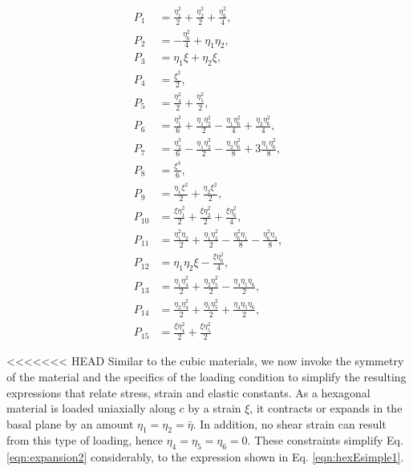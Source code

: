 \documentclass[showpacs,aps,floatfix,prb,reprint,superscriptaddress,onecolumn]{revtex4-1}
\begin{document}
\begin{enumerate}
\begin{subequations}
\label{eqn:expansion2detailed} 
\begin{align}
        P_{1} &=\frac{\eta_{1}^2}{2}  + \frac{\eta_{2}^2}{2} + \frac{\eta_{6}^2}{4} ,\\
        P_{2} &=-\frac{\eta_{6}^2}{4} + \eta_{1}\eta_{2} ,\\
				P_{3} &=\eta_{1}\xi + \eta_{2}\xi , \\
				P_{4} &=\frac{\xi^2}{2} , \\
				P_{5} &=\frac{\eta_{4}^2}{2} + \frac{\eta_{5}^2}{2} , \\
				P_{6} &=\frac{\eta_{1}^3}{6} + \frac{\eta_{1}\eta_{2}^2}{2} - \frac{\eta_{1}\eta_{6}^2}{4} + \frac{\eta_{2}\eta_{6}^2}{4} , \\
				P_{7} &=\frac{\eta_{2}^3}{6} - \frac{\eta_{1}\eta_{2}^2}{2} - \frac{\eta_{2}\eta_{6}^2}{8} + 3\frac{\eta_{1}\eta_{6}^2}{8} , \\
				P_{8} &=\frac{\xi^3}{6} , \\
				P_{9} &=\frac{\eta_{1}\xi^2}{2} + \frac{\eta_{2}\xi^2}{2} , \\
				P_{10} &=\frac{\xi \eta_{1}^2}{2} + \frac{\xi \eta_{2}^2}{2} + \frac{\xi \eta_{6}^2}{4} , \\
				P_{11} &=\frac{\eta_{1}^2\eta_{2}}{2} +  \frac{\eta_{1}\eta_{2}^2}{2} - \frac{\eta_{6}^2\eta_{1}}{8} - \frac{\eta_{6}^2\eta_{2}}{8} , \\
				P_{12} &=\eta_{1}\eta_{2}\xi - \frac{\xi\eta_{6}^2}{4} , \\
				P_{13} &=\frac{\eta_{1}\eta_{4}^2}{2} + \frac{\eta_{2}\eta_{5}^2}{2} - \frac{\eta_{4}\eta_{5}\eta_{6}}{2} , \\
				P_{14} &=\frac{\eta_{2}\eta_{4}^2}{2} + \frac{\eta_{1}\eta_{5}^2}{2} + \frac{\eta_{4}\eta_{5}\eta_{6}}{2} , \\
				P_{15} &=\frac{\xi \eta_{4}^2}{2} + \frac{\xi \eta_{5}^2}{2} 
\end{align}
\end{subequations}

<<<<<<< HEAD
Similar to the cubic materials, we now invoke the symmetry of the material and the specifics of the loading condition to simplify the resulting expressions that relate stress, strain and elastic constants. As a hexagonal material is loaded uniaxially along $c$ by a strain $\xi$, it contracts or expands in the basal plane by an amount $\eta_{1} = \eta_{2} = \bar{\eta}$. In addition, no shear strain can result from this type of loading, hence $\eta_{4} = \eta_{5} = \eta_{6} = 0$. These constraints simplify Eq. \ref{eqn:expansion2} considerably, to the expression shown in Eq. \ref{eqn:hexEsimple1}.


\end{enumerate}
\end{document}
